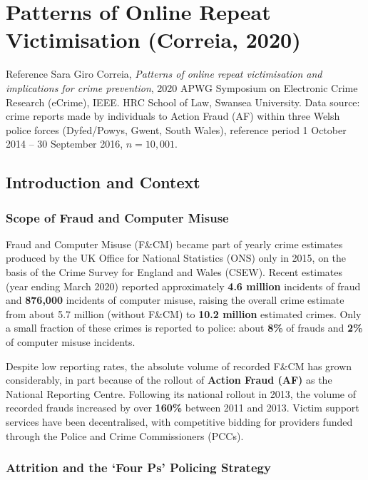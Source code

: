 \documentclass[11pt,a4paper,openany]{report}
\theoremstyle{definition}
\theoremstyle{plain}
\theoremstyle{remark}
\begin{document}
\chapter{Patterns of Online Repeat Victimisation (Correia, 2020)}
\label{chap:correia}

\begin{sourcebox}{Reference}
Sara Giro Correia, \textit{Patterns of online repeat victimisation and implications for crime prevention}, 2020 APWG Symposium on Electronic Crime Research (eCrime), IEEE. HRC School of Law, Swansea University. Data source: crime reports made by individuals to Action Fraud (AF) within three Welsh police forces (Dyfed/Powys, Gwent, South Wales), reference period 1 October 2014 -- 30 September 2016, $n = 10{,}001$.
\end{sourcebox}

\section{Introduction and Context}

\subsection{Scope of Fraud and Computer Misuse}

Fraud and Computer Misuse (F\&CM) became part of yearly crime estimates produced by the UK Office for National Statistics (ONS) only in 2015, on the basis of the Crime Survey for England and Wales (CSEW). Recent estimates (year ending March 2020) reported approximately \textbf{4.6 million} incidents of fraud and \textbf{876{,}000} incidents of computer misuse, raising the overall crime estimate from about 5.7 million (without F\&CM) to \textbf{10.2 million} estimated crimes. Only a small fraction of these crimes is reported to police: about \textbf{8\%} of frauds and \textbf{2\%} of computer misuse incidents.

Despite low reporting rates, the absolute volume of recorded F\&CM has grown considerably, in part because of the rollout of \textbf{Action Fraud (AF)} as the National Reporting Centre. Following its national rollout in 2013, the volume of recorded frauds increased by over \textbf{160\%} between 2011 and 2013. Victim support services have been decentralised, with competitive bidding for providers funded through the Police and Crime Commissioners (PCCs).

\subsection{Attrition and the `Four Ps' Policing Strategy}
\end{document}
